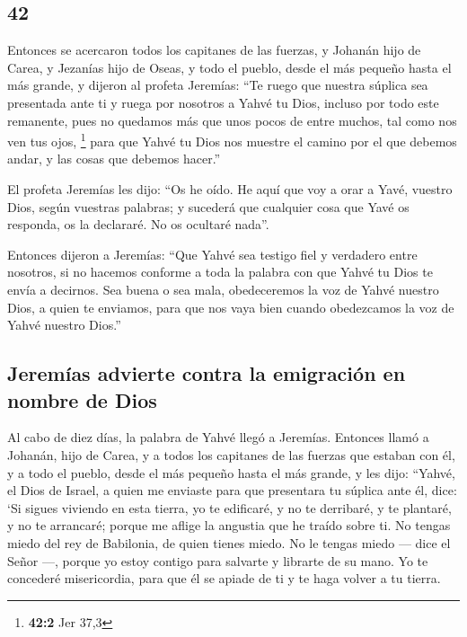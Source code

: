 \begin{paracol}{2}
\hypertarget{section-82}{%
\section{42}\label{section-82}}

 Entonces se acercaron todos los capitanes de las fuerzas,
y Johanán hijo de Carea, y Jezanías hijo de Oseas, y todo el pueblo,
desde el más pequeño hasta el más grande,  y dijeron al
profeta Jeremías: ``Te ruego que nuestra súplica sea presentada ante ti
y ruega por nosotros a Yahvé tu Dios, incluso por todo este remanente,
pues no quedamos más que unos pocos de entre muchos, tal como nos ven
tus ojos, \footnote{\textbf{42:2} Jer 37,3}  para que
Yahvé tu Dios nos muestre el camino por el que debemos andar, y las
cosas que debemos hacer.''

 El profeta Jeremías les dijo: ``Os he oído. He aquí que
voy a orar a Yavé, vuestro Dios, según vuestras palabras; y sucederá que
cualquier cosa que Yavé os responda, os la declararé. No os ocultaré
nada''.

 Entonces dijeron a Jeremías: ``Que Yahvé sea testigo fiel
y verdadero entre nosotros, si no hacemos conforme a toda la palabra con
que Yahvé tu Dios te envía a decirnos.  Sea buena o sea
mala, obedeceremos la voz de Yahvé nuestro Dios, a quien te enviamos,
para que nos vaya bien cuando obedezcamos la voz de Yahvé nuestro
Dios.''

\hypertarget{jeremuxedas-advierte-contra-la-emigraciuxf3n-en-nombre-de-dios}{%
\subsection{Jeremías advierte contra la emigración en nombre de
Dios}\label{jeremuxedas-advierte-contra-la-emigraciuxf3n-en-nombre-de-dios}}

 Al cabo de diez días, la palabra de Yahvé llegó a
Jeremías.  Entonces llamó a Johanán, hijo de Carea, y a
todos los capitanes de las fuerzas que estaban con él, y a todo el
pueblo, desde el más pequeño hasta el más grande,  y les
dijo: ``Yahvé, el Dios de Israel, a quien me enviaste para que
presentara tu súplica ante él, dice:  `Si sigues viviendo
en esta tierra, yo te edificaré, y no te derribaré, y te plantaré, y no
te arrancaré; porque me aflige la angustia que he traído sobre ti.
 No tengas miedo del rey de Babilonia, de quien tienes
miedo. No le tengas miedo --- dice el Señor ---, porque yo estoy contigo
para salvarte y librarte de su mano.  Yo te concederé
misericordia, para que él se apiade de ti y te haga volver a tu tierra.


\end{paracol}
